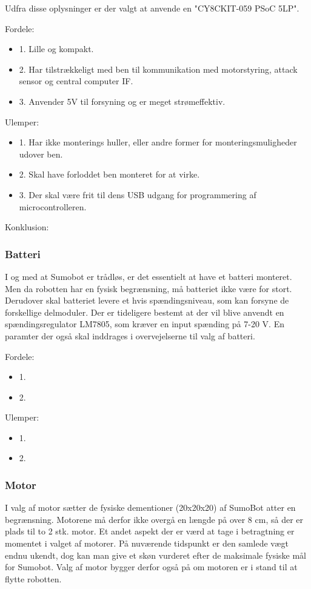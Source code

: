 Udfra disse oplysninger er der valgt at anvende en "CY8CKIT-059 PSoC 5LP". 

Fordele: 
\begin{itemize}
\item 1. Lille og kompakt.
\item 2. Har tilstrækkeligt med ben til kommunikation med motorstyring, attack sensor og central computer IF.
\item 3. Anvender 5V til forsyning og er meget strømeffektiv.
\end{itemize}

Ulemper: 
\begin{itemize}
\item 1. Har ikke monterings huller, eller andre former for monteringsmuligheder udover ben.
\item 2. Skal have forloddet ben monteret for at virke.
\item 3. Der skal være frit til dens USB udgang for programmering af microcontrolleren. 
\end{itemize}

Konklusion:


\subsubsection*{\textbf{Batteri}}
I og med at Sumobot er trådløs, er det essentielt at have et batteri monteret. Men da robotten har en fysisk begrænsning, må batteriet ikke være for stort. Derudover skal batteriet levere et hvis spændingsniveau, som kan forsyne de forskellige delmoduler.
Der er tideligere bestemt at der vil blive anvendt en spændingsregulator LM7805, som kræver en input spænding på 7-20 V. En paramter der også skal inddrages i overvejelserne til valg af batteri.

Fordele: 
\begin{itemize}
\item 1.
\item 2.
\end{itemize}

Ulemper: 
\begin{itemize}
\item 1.
\item 2.
\end{itemize}


\subsubsection*{\textbf{Motor}}
I valg af motor sætter de fysiske dementioner (20x20x20) af SumoBot atter en begrænsning. Motorene må derfor ikke overgå en længde på over 8 cm, så der er plads til to 2 stk. motor. Et andet aspekt der er værd at tage i betragtning er momentet i valget af motorer. På nuværende tidspunkt er den samlede vægt endnu ukendt, dog kan man give et skøn vurderet efter de maksimale fysiske mål for Sumobot. Valg af motor bygger derfor også på om motoren er i stand til at flytte robotten. \tbd



